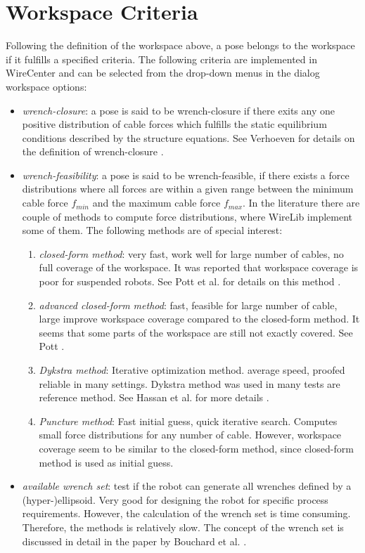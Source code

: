 \documentclass[11pt,a4paper,onepage,openany]{book}
\begin{document}
\section{Workspace Criteria}
Following the definition of the workspace above, a pose belongs to the
workspace if it fulfills a specified criteria. The following criteria are
implemented in WireCenter and can be selected from the drop-down menus in the
dialog workspace options:
\begin{itemize}
\item \emph{wrench-closure}: a pose is said to be wrench-closure if there
    exits any one positive distribution of cable forces which fulfills the
    static equilibrium conditions described by the structure equations. See
    Verhoeven for details on the definition of wrench-closure
    \cite{Verhoeven2004}.

\item \emph{wrench-feasibility}: a pose is said to be wrench-feasible, if
    there exists a force distributions where all forces are within a given
    range between the minimum cable force $f_{min}$ and the maximum cable
    force $f_{max}$. In the literature there are couple of methods to compute
    force distributions, where WireLib implement some of them. The following
    methods are of special interest:
    \begin{enumerate}
    \item \emph{closed-form method}: very fast, work well for large number
        of cables, no full coverage of the workspace. It was reported that
        workspace coverage is poor for suspended robots. See Pott et al.
        for details on this method \cite{Pott2009}.
    \item \emph{advanced closed-form method}: fast, feasible for large
        number of cable, large improve workspace coverage compared to the
        closed-form method. It seems that some parts of the workspace are
        still not exactly covered. See Pott \cite{Pott2013}.
    \item \emph{Dykstra method}: Iterative optimization method. average
        speed, proofed reliable in many settings. Dykstra method was used
        in many tests are reference method. See Hassan et al. for more
        details \cite{Hassan2007}.
    \item \emph{Puncture method}: Fast initial guess, quick iterative
        search. Computes small force distributions for any number of cable.
        However, workspace coverage seem to be similar to the closed-form
        method, since closed-form method is used as initial guess.
    \end{enumerate}
\item \emph{available wrench set}: test if the robot can generate all
    wrenches defined by a (hyper-)ellipsoid. Very good for designing the
    robot for specific process requirements. However, the calculation of the
    wrench set is time consuming. Therefore, the methods is relatively slow.
    The concept of the wrench set is discussed in detail in the paper by
    Bouchard et al. \cite{Bouchard2010}.


\end{itemize}
\end{document}
